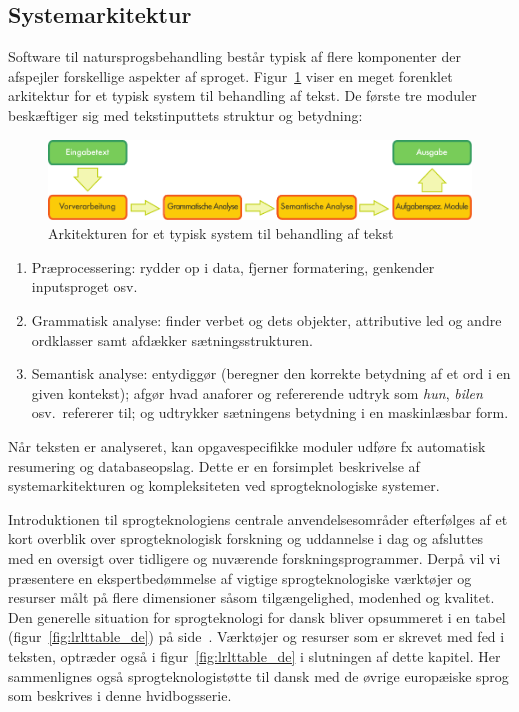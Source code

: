 \documentclass[]{../../metanetpaper}
\begin{document}
\begin{multicols}{2}
\subsection{Systemarkitektur}

 Software til natursprogsbehandling best\aa r typisk af flere komponenter der afspejler forskellige aspekter af sproget.  Figur~\ref{fig:textprocessingarch_de} viser en meget forenklet arkitektur for et typisk system til behandling af tekst. De f\o rste tre moduler besk\ae ftiger sig med tekstinputtets struktur og betydning:

\begin{figure}[htb]
  \center
  \includegraphics[width=\textwidth]{../_media/german/text_processing_app_architecture}
  \caption{Arkitekturen for et typisk system til behandling af tekst}
  \label{fig:textprocessingarch_de}
\end{figure}

\begin{enumerate}
  \item Pr\ae processering: rydder op i data, fjerner formatering, genkender inputsproget osv.
      \item Grammatisk analyse: finder verbet og dets objekter, attributive led og andre ordklasser samt afd\ae kker s\ae tningsstrukturen.
      \item Semantisk analyse: entydigg\o r (beregner den korrekte betydning af et ord i en given kontekst); afg\o r hvad anaforer og refererende udtryk som {\it hun}, {\it bilen} osv.\ refererer til; og udtrykker s\ae tningens betydning i en maskinl\ae sbar form.
\end{enumerate}

N\aa r teksten er analyseret, kan opgavespecifikke moduler udf\o re fx automatisk resumering og databaseopslag. Dette er en forsimplet beskrivelse af systemarkitekturen og kompleksiteten ved sprogteknologiske systemer.

Introduktionen til sprogteknologiens centrale anvendelsesomr\aa der efterf\o lges af et kort overblik over sprogteknologisk forskning og uddannelse i dag og afsluttes med en oversigt over tidligere og nuv\ae rende forskningsprogrammer. \mbox{Derp\aa} vil vi pr\ae sentere en ekspertbed\o mmelse af vigtige sprogteknologiske v\ae rkt\o jer og resurser m\aa lt \mbox{p\aa} flere dimensioner s\aa som tilg\ae ngelighed, modenhed og kvalitet. Den generelle situation for sprogteknologi for dansk bliver opsummeret i en tabel (figur~\ref{fig:lrlttable_de}) \mbox{p\aa} side~\pageref{fig:lrlttable_de}. V\ae rkt\o jer og resurser som er skrevet med fed i teksten, optr\ae der \mbox{ogs\aa} i figur~\ref{fig:lrlttable_de} i slutningen af dette kapitel. Her sammenlignes \mbox{ogs\aa} sprogteknologist\o tte til dansk med de \o vrige europ\ae iske sprog som beskrives i denne hvidbogsserie.



\end{multicols}
\end{document}
